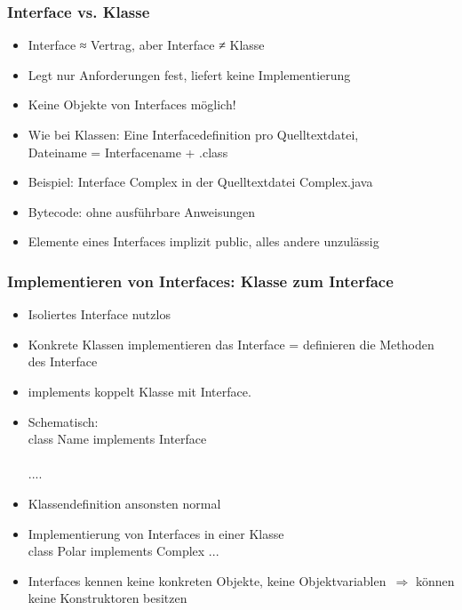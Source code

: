 \subsubsection{Interface vs. Klasse}
\begin{itemize}
\item Interface ≈ Vertrag, aber Interface ≠ Klasse
\item Legt nur Anforderungen fest, liefert keine Implementierung
\item Keine Objekte von Interfaces möglich!
\item Wie bei Klassen: Eine Interfacedefinition pro Quelltextdatei, \\
Dateiname = Interfacename + .class
\item Beispiel: Interface Complex in der Quelltextdatei Complex.java
\item Bytecode: ohne ausführbare Anweisungen
\item Elemente eines Interfaces implizit public, alles andere unzulässig
\end{itemize}

\subsubsection{Implementieren von Interfaces: Klasse zum Interface}
\begin{itemize}
\item Isoliertes Interface nutzlos
\item Konkrete Klassen implementieren das Interface = definieren die Methoden des Interface
\item implements koppelt Klasse mit Interface.
\item Schematisch:\\
class Name implements Interface\\
{\\
.\qquad...\\
}
\item Klassendefinition ansonsten normal
\item Implementierung von Interfaces in einer Klasse \\
class Polar implements Complex {...}
\item Interfaces kennen keine konkreten Objekte, keine Objektvariablen\ $\Rightarrow$ können keine Konstruktoren besitzen
\end{itemize}

